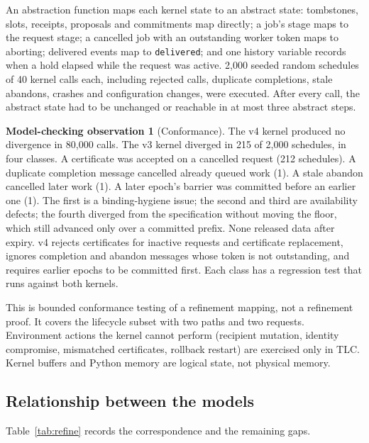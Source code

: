 \documentclass[pdflatex,sn-mathphys-num]{sn-jnl}
\theoremstyle{plain}
\theoremstyle{definition}
\newtheorem{observation}{Model-checking observation}
\newcommand{\code}[1]{\texttt{#1}}
\begin{document}
An abstraction function maps each kernel state to an abstract state: tombstones, slots, receipts, proposals and commitments map directly; a job's stage maps to the request stage; a cancelled job with an outstanding worker token maps to aborting; delivered events map to \code{delivered}; and one history variable records when a hold elapsed while the request was active. 2,000 seeded random schedules of 40 kernel calls each, including rejected calls, duplicate completions, stale abandons, crashes and configuration changes, were executed. After every call, the abstract state had to be unchanged or reachable in at most three abstract steps.

\begin{observation}[Conformance]\label{obs:conformance}
The v4 kernel produced no divergence in 80,000 calls. The v3 kernel diverged in 215 of 2,000 schedules, in four classes. A certificate was accepted on a cancelled request (212 schedules). A duplicate completion message cancelled already queued work (1). A stale abandon cancelled later work (1). A later epoch's barrier was committed before an earlier one (1). The first is a binding-hygiene issue; the second and third are availability defects; the fourth diverged from the specification without moving the floor, which still advanced only over a committed prefix. None released data after expiry. v4 rejects certificates for inactive requests and certificate replacement, ignores completion and abandon messages whose token is not outstanding, and requires earlier epochs to be committed first. Each class has a regression test that runs against both kernels.
\end{observation}

This is bounded conformance testing of a refinement mapping, not a refinement proof. It covers the lifecycle subset with two paths and two requests. Environment actions the kernel cannot perform (recipient mutation, identity compromise, mismatched certificates, rollback restart) are exercised only in TLC. Kernel buffers and Python memory are logical state, not physical memory.

\subsection{Relationship between the models}
Table~\ref{tab:refine} records the correspondence and the remaining gaps.
\end{document}
